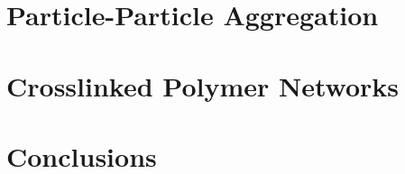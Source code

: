 \documentclass[11pt,a4paper,twoside,openright]{book}
\begin{document}
\begin{sloppy}
\chapter{Particle-Particle Aggregation}\label{ch: Particle-Particle Aggregation}
    
%
%
%
%
\chapter{Crosslinked Polymer Networks}\label{ch: CrosslinkNet}
    
%
%
%
%
\chapter{Conclusions \label{ch:conclusion}}
    
    
%
%
% 
%
%
\printbibliography[heading=bibintoc]

%    
%
%
%


\end{sloppy}
\end{document}
